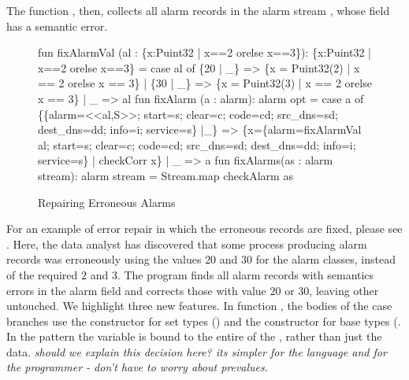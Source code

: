 The function , then,
collects all alarm records in the alarm stream , whose
 field has a semantic error.

\begin{figure}
  \centering
\begin{code}
fun fixAlarmVal (al : \{x:Puint32 | x==2 orelse x==3\}): 
  \{x:Puint32 | x==2 orelse x==3\} =
    case al of
      \{20 | _\} => \{x = Puint32(2) | x == 2 orelse x == 3\}
    | \{30 | _\} => \{x = Puint32(3) | x == 2 orelse x == 3\}
    | _ => al
\mbox{}
fun fixAlarm (a : alarm): alarm opt =
    case a of 
	\{\{alarm=<<al,S>>; start=s; clear=c; 
          code=cd; src_dns=sd; dest_dns=dd; 
	  info=i; service=s\} |_\} 
          => \{x=\{alarm=fixAlarmVal al; 
                 start=s; clear=c; 
                 code=cd; src_dns=sd; dest_dns=dd; 
                 info=i; service=s\}
              | checkCorr x\} 
      | _ => a
\mbox{}
fun fixAlarms(as : alarm stream): alarm stream =
    Stream.map checkAlarm as
\end{code}
  \caption{Repairing Erroneous Alarms}
  \label{fig:ex-error-repair}
\end{figure}

For an example of error repair in which the erroneous records are
fixed, please see . Here, the data analyst
has discovered that some process producing alarm records was
erroneously using the values $20$ and $30$ for the alarm classes,
instead of the required $2$ and $3$. The program finds all alarm
records with semantics errors in the alarm field and corrects those
with value $20$ or $30$, leaving other untouched. We highlight three
new features. In function , the bodies of the case
branches use the constructor for set types () and the
constructor for base types (.  In the pattern
 the variable  is bound to the entire \pvalue{} of
the  \pvalue{}, rather than just the data. {\em should we
  explain this decision here?  its simpler for the language and for
  the programmer - don't have to worry about prevalues.}

